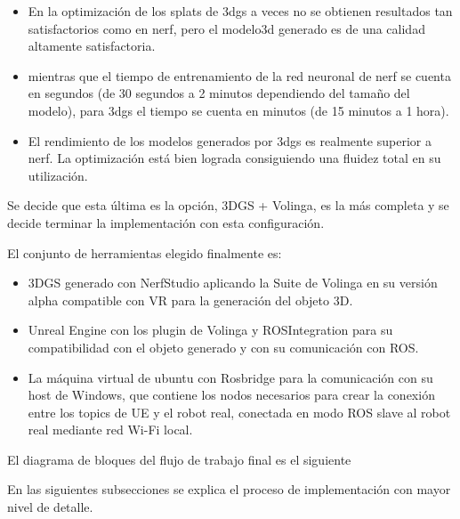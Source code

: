 \documentclass[a4paper, 12pt, spanish, twoside]{article}
\begin{document}
\begin{itemize}
\item En la optimización de los splats de \acrshort{3dgs} a veces no se obtienen resultados tan satisfactorios como en \acrshort{nerf}, pero el \gls{modelo3d} generado es de una calidad altamente satisfactoria. 

\item mientras que el tiempo de entrenamiento de la red neuronal de \acrshort{nerf} se cuenta en segundos (de 30 segundos a 2 minutos dependiendo del tamaño del modelo), para \acrshort{3dgs} el tiempo se cuenta en minutos (de 15 minutos a 1 hora). 

\item El rendimiento de los modelos generados por \acrshort{3dgs} es realmente superior a \gls{nerf}. La optimización está bien lograda consiguiendo una fluidez total en su utilización. 
\end{itemize} 

Se decide que esta última es la opción, 3DGS + Volinga, es la más completa y se decide terminar la implementación con esta configuración. 

El conjunto de herramientas elegido finalmente es: 


\begin{itemize} 
\item 3DGS generado con NerfStudio aplicando la Suite de Volinga en su versión alpha compatible con VR para la generación del objeto 3D. 

\item Unreal Engine con los plugin de Volinga y ROSIntegration para su compatibilidad con el objeto generado y con su comunicación con ROS. 

\item La máquina virtual de ubuntu con Rosbridge para la comunicación con su host de Windows, que contiene los nodos necesarios para crear la conexión entre los topics de UE y el robot real, conectada en modo ROS slave al robot real mediante red Wi-Fi local. 
\end{itemize} 

El diagrama de bloques del flujo de trabajo final es el siguiente

En las siguientes subsecciones se explica el proceso de implementación con mayor nivel de detalle. 

\end{document}
